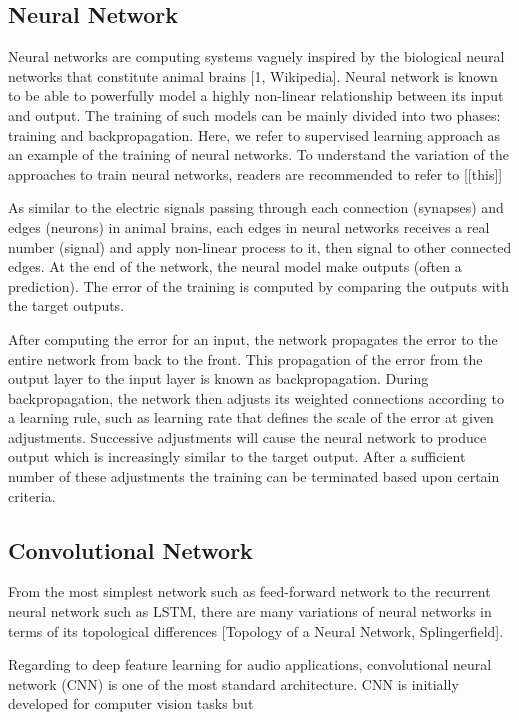 \subsection{Neural Network}

Neural networks are computing systems vaguely inspired by the biological neural networks that constitute animal brains [1, Wikipedia]. Neural network is known to be able to powerfully model a highly non-linear relationship between its input and output. The training of such models can be mainly divided into two phases: training and backpropagation. Here, we refer to supervised learning approach as an example of the training of neural networks. To understand the variation of the approaches to train neural networks, readers are recommended to refer to [[this]]

As similar to the electric signals passing through each connection (synapses) and edges (neurons) in animal brains, each edges in neural networks receives a real number (signal) and apply non-linear process to it, then signal to other connected edges. At the end of the network, the neural model make outputs (often a prediction). The error of the training is computed by comparing the outputs with the target outputs. 

After computing the error for an input, the network propagates the error to the entire network from back to the front. This propagation of the error from the output layer to the input layer is known as backpropagation. During backpropagation, the network then adjusts its weighted connections according to a learning rule, such as learning rate that defines the scale of the error at given adjustments. Successive adjustments will cause the neural network to produce output which is increasingly similar to the target output. After a sufficient number of these adjustments the training can be terminated based upon certain criteria.

\subsection{Convolutional Network}
From the most simplest network such as feed-forward network to the recurrent neural network such as LSTM, there are many variations of neural networks in terms of its topological differences [Topology of a Neural Network, Splingerfield].

Regarding to deep feature learning for audio applications, convolutional neural network (CNN) is one of the most standard architecture. CNN is initially developed for computer vision tasks but


